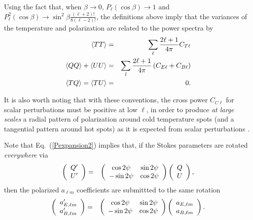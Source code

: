 \documentclass[12pt,twoside]{article}
\newcommand{\myhtmlimage}[1]{ }
\begin{document}
Using the fact that, when $\beta \rightarrow 0$, $P_\ell(\cos\beta) \rightarrow 1$ and $P_\ell^2(\cos
\beta) \rightarrow \sin^2 \beta \frac{(\ell+2)!}{8 (\ell-2)!}$, 
the definitions above imply that the variances of the temperature and
polarization are related to the power spectra by
\begin{eqnarray}
\langle TT \rangle &=& \sum_\ell {2\ell+1 \over 4 \pi}
C_{T\ell}  \nonumber \\ 
\langle QQ \rangle + \langle UU\rangle &=& \sum_l {2\ell+1 \over 4 \pi} \left(C_{E\ell}
+C_{B\ell}\right)  \nonumber \\ 
\langle TQ\rangle = \langle TU\rangle &=& 0.\myhtmlimage{}
\label{var}
\end{eqnarray}

It is also worth noting that with these conventions, the cross power $C_{C\ell}$
for scalar perturbations
must be positive at low $\ell$, in order to produce {\em at large scales} a radial pattern of
polarization around cold temperature spots (and a tangential pattern around hot
spots) as it is expected from scalar perturbations \citep{crco}.

Note that Eq.~(\ref{Pexpansion2}) implies that, if the Stokes parameters are
rotated {\em everywhere} via
\begin{eqnarray}
\left(\begin{array}{c} 
	Q'\\U'
\end{array}\right) &=& 
\left(\begin{array}{c c}
  	\cos2\psi & \sin2\psi \\ 
	-\sin2\psi & \cos2\psi
\end{array} \right) 
\left(\begin{array}{c} 
	Q\\U
\end{array} \right),\label{eq:rotateQU} %
\end{eqnarray}
then the polarized $a_{\ell m}$ coefficients are submittted to the same rotation
\begin{eqnarray}
\left(\begin{array}{c} 
	a_{E,\ell m}'\\a_{B,\ell m}'
\end{array}\right) &=& 
\left(\begin{array}{c c}
	\cos2\psi & \sin2\psi \\ 
	-\sin2\psi & \cos2\psi
\end{array} \right) 
\left(\begin{array}{c} 
	a_{E,\ell m}\\a_{B,\ell m}
\end{array} \right).\label{eq:rotateEB} %
\end{eqnarray}
\end{document}
